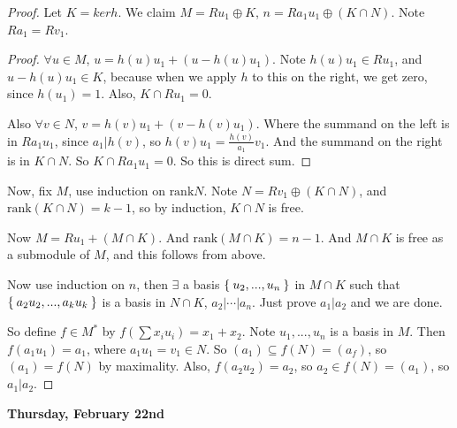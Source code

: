 \documentclass[12pt]{amsbook}
\theoremstyle{plain}
\numberwithin{section}{chapter}
\numberwithin{equation}{chapter}
\theoremstyle{definition}
\theoremstyle{remark}
\newcommand{\sub}{\subseteq}
\newcommand{\fracc}{\frac}
\newcommand{\rank}{\text{rank}}
\begin{document}
\begin{proof}
Let $K = ker h$. We claim $M = Ru_1 \oplus K$, $n = Ra_1u_1 \oplus (K \cap N)$. Note $Ra_1 = Rv_1$. 

\begin{proof}
$\forall u \in M$, $u = h(u)u_1 + (u - h(u)u_1)$. Note $h(u)u_1 \in Ru_1$, and $u - h(u)u_1 \in K$, because when we apply $h$ to this on the right, we get zero, since $h(u_1) = 1$. Also, $K \cap Ru_1 = 0$. 

Also $\forall v \in N$, $v = h(v)u_1 + (v - h(v)u_1)$. Where the summand on the left is in $Ra_1u_1$, since $a_1|h(v)$, so $h(v)u_1 = \fracc{h(v)}{a_1}v_1$. And the summand on the right is in $K \cap N$. So $K \cap Ra_1u_1 = 0$. So this is direct sum. 
\end{proof}
Now, fix $M$, use induction on $\rank N$. Note $N = Rv_1 \oplus (K \cap N)$, and $\rank(K \cap N) = k - 1$, so by induction, $K \cap N$ is free. 

Now $M = Ru_1 + (M \cap K)$. And $\rank(M \cap K) = n - 1$. And $M \cap K$ is free as a submodule of $M$, and this follows from above. 

Now use induction on $n$, then $\exists$ a basis $\Set{u_2,...,u_n}$ in $M\cap K$ such that $\Set{a_2u_2,...,a_ku_k}$ is a basis in $N \cap K$, $a_2|\cdots|a_n$. Just prove $a_1|a_2$ and we are done. 

So define $f \in M^*$ by $f(\sum x_iu_i) = x_1 + x_2$. Note $u_1,...,u_n$ is a basis in $M$. Then $f(a_1u_1) = a_1$, where $a_1u_1 = v_1 \in N$. So $(a_1) \sub f(N) = (a_f)$, so $(a_1) = f(N)$ by maximality. Also, $f(a_2u_2) = a_2$, so $a_2 \in f(N) = (a_1)$, so $a_1|a_2$. 
\end{proof}

\textbf{Thursday, February 22nd}
\end{document}
